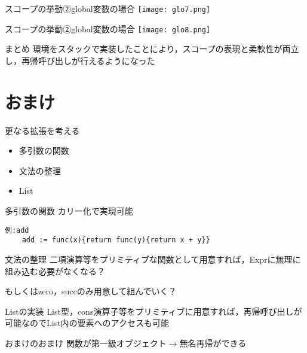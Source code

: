 \documentclass[uplatex,dvipdfmx,ja=standard]{beamer}
\begin{document}
\begin{frame}[fragile]{スコープの挙動②global変数の場合}
    \centering 
    \texttt{[image: glo7.png]}
\end{frame}

\begin{frame}[fragile]{スコープの挙動②global変数の場合}
    \centering 
    \texttt{[image: glo8.png]}
\end{frame}

\begin{frame}{まとめ}
環境をスタックで実装したことにより，スコープの表現と柔軟性が両立し，再帰呼び出しが行えるようになった
\end{frame}

\section{おまけ}

\begin{frame}{更なる拡張を考える}
    \begin{itemize}
        \item 多引数の関数
        \item 文法の整理
        \item List
    \end{itemize}
\end{frame}

\begin{frame}[fragile]{多引数の関数}
    カリー化で実現可能
    \begin{verbatim}
例:add
    add := func(x){return func(y){return x + y}}
    \end{verbatim}
\end{frame}

\begin{frame}{文法の整理}
二項演算等をプリミティブな関数として用意すれば，Exprに無理に組み込む必要がなくなる？

もしくはzero，succのみ用意して組んでいく？
\end{frame}

\begin{frame}[fragile]{Listの実装}
List型，cons演算子等をプリミティブに用意すれば，再帰呼び出しが可能なのでList内の要素へのアクセスも可能

\end{frame}

\begin{frame}[fragile]{おまけのおまけ}
    関数が第一級オブジェクト$\to$無名再帰ができる
    \begin{verbatim}

    \end{verbatim}
\end{frame}
\end{document}
